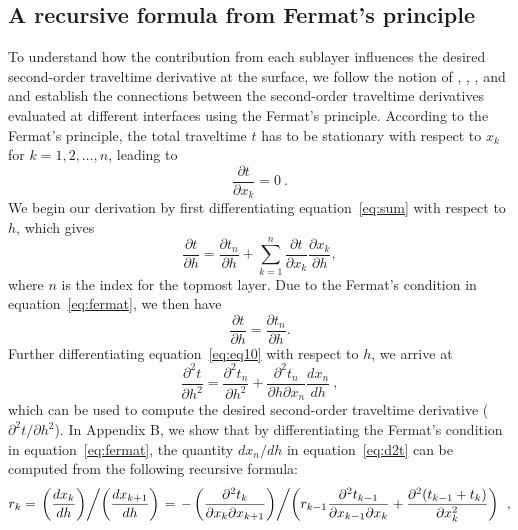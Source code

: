 \subsection{A recursive formula from Fermat's principle}

To understand how the contribution from each sublayer influences the desired second-order traveltime derivative at the surface, we follow the notion of \cite{blias1981}, \cite{bliasgrit1984}, \cite{gritsenko}, and \cite{goldin} and establish the connections between the second-order traveltime derivatives evaluated at different interfaces using the Fermat's principle. According to the Fermat's principle, the total traveltime $t$ has to be stationary with respect to $x_k$ for $k=1,2,\ldots,n$, leading to
\begin{equation}
\label{eq:fermat}
\frac{\partial t}{\partial x_k}=0~.
\end{equation}
We begin our derivation by first differentiating equation~\ref{eq:sum} with respect to $h$, which gives
\begin{equation}
\label{eq:eq9}
\frac{\partial t}{\partial h}=\frac{\partial t_n}{\partial h}+\sum_{k=1}^n \frac{\partial t}{\partial x_k} \frac{\partial x_k}{\partial h},
\end{equation}
where $n$ is the index for the topmost layer. Due to the Fermat’s condition in equation~\ref{eq:fermat}, we then have
\begin{equation}
\label{eq:eq10}
\frac{\partial t}{\partial h}=\frac{\partial t_n}{\partial h}.
\end{equation}
Further differentiating equation~\ref{eq:eq10} with respect to $h$, we arrive at
\begin{equation}
\label{eq:d2t}
\frac{\partial^2 t}{\partial h^2} = \frac{\partial^2 t_n}{\partial h^2} + \frac{\partial^2 t_n}{\partial h \partial x_n} \frac{d x_n}{dh}~,
\end{equation}
which can be used to compute the desired second-order traveltime derivative (${\partial^2 t}/{\partial h^2}$). In Appendix B, we show that by differentiating the Fermat’s condition in equation~\ref{eq:fermat}, the quantity $d x_n/dh$ in equation~\ref{eq:d2t} can be computed from the following recursive formula:
\begin{equation}
\label{eq:recursion}
 r_k = \left. \left( \frac{d x_k}{d h}\right) \middle/ \left( \frac{d x_{k+1}}{d h}\right)\right. = \left. -\left( \frac{\partial^2 t_k}{\partial x_k \partial x_{k+1}} \right) \middle/ \left(  r_{k-1} \frac{\partial^2 t_{k-1}}{\partial x_{k-1} \partial x_k}  + \frac{\partial^2 (t_{k-1} + t_k)}{\partial x_k^2} \right)\right. ~,
\end{equation}
